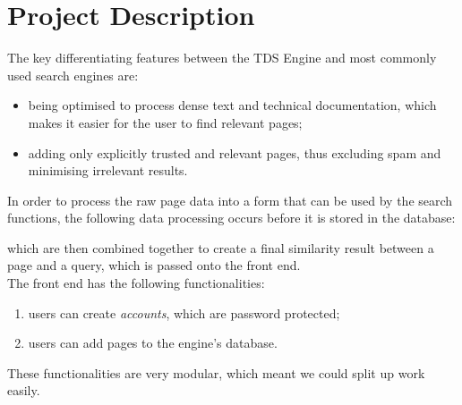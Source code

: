 \section{Project Description}

The key differentiating features between the TDS Engine and most commonly used search engines are:

\begin{itemize}
  \item being optimised to process dense text and technical documentation, which makes it easier for the user to find relevant pages;
  \item adding only explicitly trusted and relevant pages, thus excluding spam and minimising irrelevant results.
\end{itemize}

In order to process the raw page data into a form that can be used by the search functions, the following data processing occurs before it is stored in the database:
which are then combined together to create a final similarity result between a page and a query, which is passed onto the front end. \\

The front end has the following functionalities:
\begin{enumerate}
  \item users can create \textit{accounts}, which are password protected;
  \item users can add pages to the engine's database.
\end{enumerate}

These functionalities are very modular, which meant we could split up work easily.  
